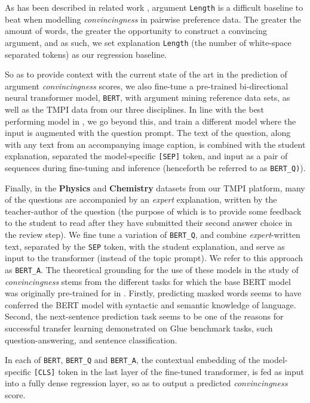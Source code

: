 \documentclass[notitlepage,12pt]{jedm}
\begin{document}
As has been described in related work \cite{habernal_which_2016}, argument 
\verb|Length| is a difficult baseline to beat when modelling 
\textit{convincingness} in pairwise preference data.
The greater the amount of words, the greater the opportunity to construct a 
convincing argument, and as such, we set explanation \verb|Length| (the number 
of white-space separated tokens) as our regression baseline. 

So as to provide context with the current state of the art in the prediction of 
argument \textit{convincingness} scores, we also fine-tune a pre-trained 
bi-directional neural transformer model, \verb|BERT|, with argument mining 
reference data sets, as well as the TMPI data from our three disciplines. 
In line with the best performing model in , we go 
beyond this, and train a different model where the input is augmented with the 
question prompt. 
The text of the question, along with any text from an accompanying image 
caption, is combined with the student explanation, separated the 
model-specific \verb|[SEP]| token, and input as a pair of sequences during 
fine-tuning and inference (henceforth be referred to as \verb|BERT_Q)|).

Finally, in the \textbf{Physics} and \textbf{Chemistry} datasets from our TMPI 
platform, many of the questions are accompanied by an \textit{expert} 
explanation, written by the teacher-author of the question (the purpose of 
which is to provide some feedback to the student to read after they have 
submitted their second answer choice in the review step).
We fine tune a variation of \verb|BERT_Q|, and combine \textit{expert}-written 
text, separated by the \verb|SEP| token, with the student explanation, and 
serve as input to the transformer (instead of the topic prompt).
We refer to this approach as \verb|BERT_A|.
The theoretical grounding for the use of these models in the study of 
\textit{convincingness} stems from the different tasks for which the base BERT 
model was originally pre-trained for in .
Firstly, predicting masked words seems to have conferred the BERT 
model with syntactic and semantic knowledge of language.
Second, the next-sentence prediction task seems to be one of the reasons for 
successful transfer learning demonstrated on Glue benchmark tasks, such 
question-answering, and sentence classification. 


In each of \verb|BERT|, \verb|BERT_Q| and \verb|BERT_A|, the contextual 
embedding of the model-specific \verb|[CLS]| token in the last layer of the 
fine-tuned transformer, is fed as input into a fully dense regression layer, so 
as to output a predicted \textit{convincingness} score.
\end{document}

